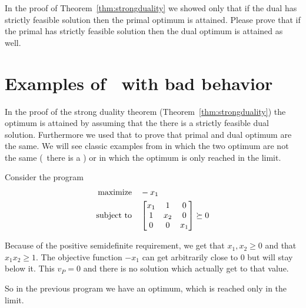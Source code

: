\documentclass[a4paper,twoside,justified]{tufte-handout}
\begin{document}
\begin{exercise}
  In the proof of Theorem~\ref{thm:strongduality} we showed only that
  if the dual has strictly feasible solution then the primal optimum
  is attained. Please prove that if the primal has strictly feasible
  solution then the dual optimum is attained as well.
\end{exercise}

\section{Examples of \sdp\ with bad behavior}

In the proof of the strong duality theorem
(Theorem~\ref{thm:strongduality}) the optimum is attained by assuming
that the there is a strictly feasible dual solution. Furthermore we
used that to prove that primal and dual optimum are the same.  We will
see classic examples from\cite{lovasz2003semidefinite} in which the
two optimum are not the same (\ie\ there is a ) or in which the optimum is only reached in the limit.

\begin{example}\label{eg:sdp-limit-solution}
  Consider the program
  \begin{alignat*}{2}
    \text{maximize}\hspace{1em}& -x_{1}\\
    \text{subject to}\hspace{1em}& \begin{bmatrix}
      x_{1} & 1 & 0\\
      1 & x_{2} & 0 \\
      0 & 0 & x_{1}
    \end{bmatrix}\succeq 0
  \end{alignat*}

  Because of the positive semidefinite requirement, we get that $
  x_{1},x_{2}\geq 0 $ and that $ x_{1}x_{2}\geq 1 $. The objective
  function  $ -x_{1} $ can get arbitrarily close to $ 0 $ but will
  stay below it. This $ v_{P}=0 $ and there is no solution which
  actually get to that value. 
\end{example}

So in the previous program we have an optimum, which is reached only
in the limit.
\end{document}
